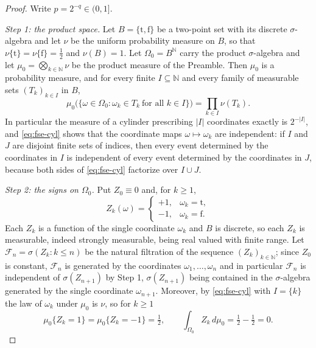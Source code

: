 \begin{proof}
Write $p=2^{-q}\in(0,1]$.

\emph{Step 1: the product space.}
Let $B=\{\mathrm t,\mathrm f\}$ be a two-point set with its discrete
$\sigma$-algebra and let $\nu$ be the uniform probability measure on $B$, so
that $\nu\{\mathrm t\}=\nu\{\mathrm f\}=\tfrac12$ and $\nu(B)=1$. Let
$\Omega_0=B^{\mathbb N}$ carry the product $\sigma$-algebra and let
$\mu_0=\bigotimes_{k\in\mathbb N}\nu$ be the product measure of the Preamble.
Then $\mu_0$ is a probability measure, and for every finite
$I\subseteq\mathbb N$ and every family of measurable sets
$(T_k)_{k\in I}$ in $B$,
\begin{equation}\label{eq:fse-cyl}
  \mu_0\bigl(\{\omega\in\Omega_0:\omega_k\in T_k\ \text{for all }k\in I\}\bigr)
    =\prod_{k\in I}\nu(T_k).
\end{equation}
In particular the measure of a cylinder prescribing $|I|$ coordinates exactly
is $2^{-|I|}$, and \eqref{eq:fse-cyl} shows that the coordinate maps
$\omega\mapsto\omega_k$ are independent: if $I$ and $J$ are disjoint finite
sets of indices, then every event determined by the coordinates in $I$ is
independent of every event determined by the coordinates in $J$, because both
sides of \eqref{eq:fse-cyl} factorize over $I\cup J$.

\emph{Step 2: the signs on $\Omega_0$.}
Put $Z_0\equiv0$ and, for $k\ge1$,
\[
  Z_k(\omega)=\begin{cases}+1,&\omega_k=\mathrm t,\\-1,&\omega_k=\mathrm f.\end{cases}
\]
Each $Z_k$ is a function of the single coordinate $\omega_k$ and $B$ is
discrete, so each $Z_k$ is measurable, indeed strongly measurable, being
real valued with finite range. Let $\mathcal F_n=\sigma(Z_k:k\le n)$ be the
natural filtration of the sequence $(Z_k)_{k\in\mathbb N}$; since $Z_0$ is
constant, $\mathcal F_n$ is generated by the coordinates $\omega_1,\dots,\omega_n$
and in particular $\mathcal F_n$ is independent of $\sigma(Z_{n+1})$ by Step 1,
$\sigma(Z_{n+1})$ being contained in the $\sigma$-algebra generated by the
single coordinate $\omega_{n+1}$. Moreover, by \eqref{eq:fse-cyl} with
$I=\{k\}$ the law of $\omega_k$ under $\mu_0$ is $\nu$, so for $k\ge1$
\begin{equation}\label{eq:fse-mean}
  \mu_0\{Z_k=1\}=\mu_0\{Z_k=-1\}=\tfrac12,
  \qquad\int_{\Omega_0}Z_k\,d\mu_0=\tfrac12-\tfrac12=0 .
\end{equation}


\end{proof}
